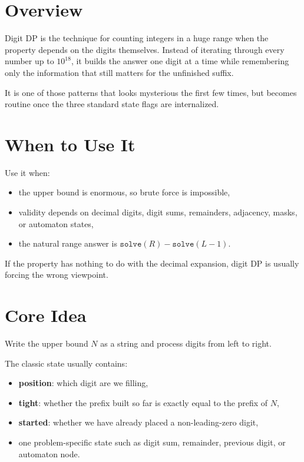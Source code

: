 \section*{Overview}

Digit DP is the technique for counting integers in a huge range when the property depends on the digits themselves.
Instead of iterating through every number up to \(10^{18}\), it builds the answer one digit at a time while
remembering only the information that still matters for the unfinished suffix.

It is one of those patterns that looks mysterious the first few times, but becomes routine once the three standard
state flags are internalized.

\section*{When to Use It}

Use it when:

\begin{itemize}
  \item the upper bound is enormous, so brute force is impossible,
  \item validity depends on decimal digits, digit sums, remainders, adjacency, masks, or automaton states,
  \item the natural range answer is \(\texttt{solve}(R) - \texttt{solve}(L - 1)\).
\end{itemize}

If the property has nothing to do with the decimal expansion, digit DP is usually forcing the wrong viewpoint.

\section*{Core Idea}

Write the upper bound \(N\) as a string and process digits from left to right.

The classic state usually contains:

\begin{itemize}
  \item \textbf{position}: which digit are we filling,
  \item \textbf{tight}: whether the prefix built so far is exactly equal to the prefix of \(N\),
  \item \textbf{started}: whether we have already placed a non-leading-zero digit,
  \item one problem-specific state such as digit sum, remainder, previous digit, or automaton node.
\end{itemize}

